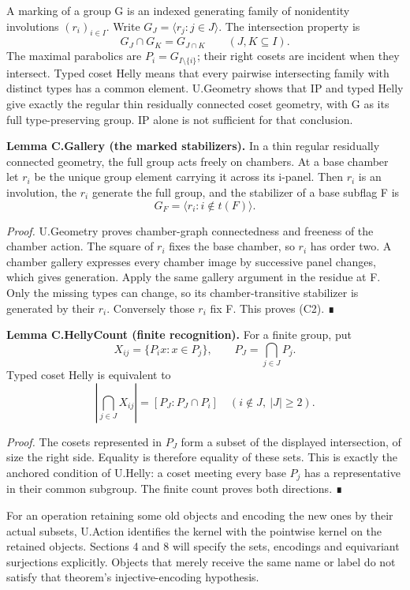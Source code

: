 \documentclass[
  11pt,
  a4paper,
]{article}
\begin{document}
A marking of a group G is an indexed generating family of nonidentity
involutions \((r_i)_{i\in I}\). Write \(G_J=\langle r_j:j\in J\rangle\).
The intersection property is \[
G_J\cap G_K=G_{J\cap K}\qquad(J,K\subseteq I).
\tag{C1}
\] The maximal parabolics are \(P_i=G_{I\setminus\{i\}}\); their right
cosets are incident when they intersect. Typed coset Helly means that
every pairwise intersecting family with distinct types has a common
element. U.Geometry shows that IP and typed Helly give exactly the
regular thin residually connected coset geometry, with G as its full
type-preserving group. IP alone is not sufficient for that conclusion.

\textbf{Lemma C.Gallery (the marked stabilizers).} In a thin regular
residually connected geometry, the full group acts freely on chambers.
At a base chamber let \(r_i\) be the unique group element carrying it
across its i-panel. Then \(r_i\) is an involution, the \(r_i\) generate
the full group, and the stabilizer of a base subflag F is \[
G_F=\langle r_i:i\notin t(F)\rangle.
\tag{C2}
\]

\emph{Proof.} U.Geometry proves chamber-graph connectedness and freeness
of the chamber action. The square of \(r_i\) fixes the base chamber, so
\(r_i\) has order two. A chamber gallery expresses every chamber image
by successive panel changes, which gives generation. Apply the same
gallery argument in the residue at F. Only the missing types can change,
so its chamber-transitive stabilizer is generated by their \(r_i\).
Conversely those \(r_i\) fix F. This proves (C2). ∎

\textbf{Lemma C.HellyCount (finite recognition).} For a finite group,
put \[
X_{ij}=\{P_i x:x\in P_j\},\qquad P_J=\bigcap_{j\in J}P_j.
\] Typed coset Helly is equivalent to \[
\left|\bigcap_{j\in J}X_{ij}\right|=[P_J:P_J\cap P_i]
\quad(i\notin J,\ |J|\ge2).
\tag{C3}
\]

\emph{Proof.} The cosets represented in \(P_J\) form a subset of the
displayed intersection, of size the right side. Equality is therefore
equality of these sets. This is exactly the anchored condition of
U.Helly: a coset meeting every base \(P_j\) has a representative in
their common subgroup. The finite count proves both directions. ∎

For an operation retaining some old objects and encoding the new ones by
their actual subsets, U.Action identifies the kernel with the pointwise
kernel on the retained objects. Sections 4 and 8 will specify the sets,
encodings and equivariant surjections explicitly. Objects that merely
receive the same name or label do not satisfy that theorem's
injective-encoding hypothesis.
\end{document}
